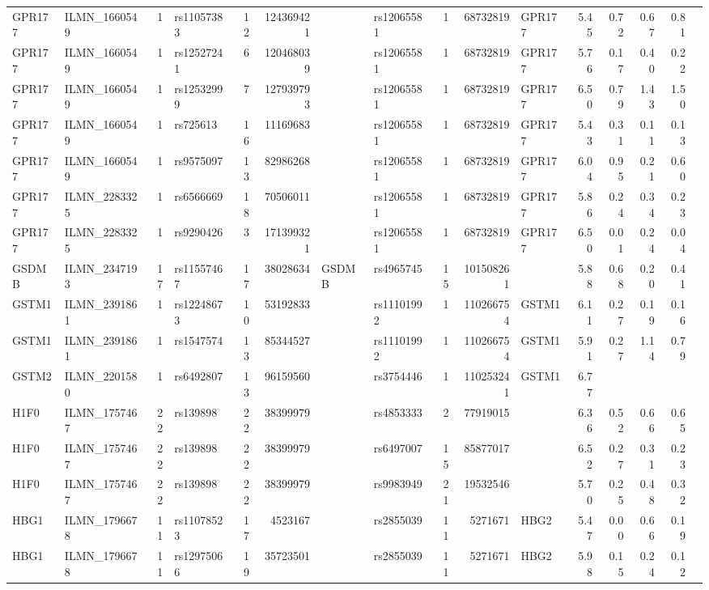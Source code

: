 \documentclass{article}
\begin{document}
\begin{landscape}
{\begin{ThreePartTable}
\begin{longtable}{|llr|lrrl|lrrl|rrrr|r|}
GPR177 & ILMN\_1660549 & 1 & rs11057383 & 12 & 124369421 &  & rs12065581 & 1 & 68732819 & GPR177 & 5.45 & 0.72 & 0.67 & 0.81 &  \\
GPR177 & ILMN\_1660549 & 1 & rs12527241 & 6 & 120468039 &  & rs12065581 & 1 & 68732819 & GPR177 & 5.76 & 0.17 & 0.40 & 0.22 &  \\
GPR177 & ILMN\_1660549 & 1 & rs12532999 & 7 & 127939793 &  & rs12065581 & 1 & 68732819 & GPR177 & 6.50 & 0.79 & 1.43 & 1.50 &  \\
GPR177 & ILMN\_1660549 & 1 & rs725613 & 16 & 11169683 &  & rs12065581 & 1 & 68732819 & GPR177 & 5.43 & 0.31 & 0.11 & 0.13 &  \\
GPR177 & ILMN\_1660549 & 1 & rs9575097 & 13 & 82986268 &  & rs12065581 & 1 & 68732819 & GPR177 & 6.04 & 0.95 & 0.21 & 0.60 &  \\
GPR177 & ILMN\_2283325 & 1 & rs6566669 & 18 & 70506011 &  & rs12065581 & 1 & 68732819 & GPR177 & 5.86 & 0.24 & 0.34 & 0.23 &  \\
GPR177 & ILMN\_2283325 & 1 & rs9290426 & 3 & 171399321 &  & rs12065581 & 1 & 68732819 & GPR177 & 6.50 & 0.01 & 0.24 & 0.04 &  \\
GSDMB & ILMN\_2347193 & 17 & rs11557467 & 17 & 38028634 & GSDMB & rs4965745 & 15 & 101508261 &  & 5.88 & 0.68 & 0.20 & 0.41 &  \\
GSTM1 & ILMN\_2391861 & 1 & rs12248673 & 10 & 53192833 &  & rs11101992 & 1 & 110266754 & GSTM1 & 6.11 & 0.27 & 0.19 & 0.16 &  \\
GSTM1 & ILMN\_2391861 & 1 & rs1547574 & 13 & 85344527 &  & rs11101992 & 1 & 110266754 & GSTM1 & 5.91 & 0.27 & 1.14 & 0.79 &  \\
GSTM2 & ILMN\_2201580 & 1 & rs6492807 & 13 & 96159560 &  & rs3754446 & 1 & 110253241 & GSTM1 & 6.77 &  &  &  &  \\
H1F0 & ILMN\_1757467 & 22 & rs139898 & 22 & 38399979 &  & rs4853333 & 2 & 77919015 &  & 6.36 & 0.52 & 0.66 & 0.65 &  \\
H1F0 & ILMN\_1757467 & 22 & rs139898 & 22 & 38399979 &  & rs6497007 & 15 & 85877017 &  & 6.52 & 0.27 & 0.31 & 0.23 &  \\
H1F0 & ILMN\_1757467 & 22 & rs139898 & 22 & 38399979 &  & rs9983949 & 21 & 19532546 &  & 5.70 & 0.25 & 0.48 & 0.32 &  \\
HBG1 & ILMN\_1796678 & 11 & rs11078523 & 17 & 4523167 &  & rs2855039 & 11 & 5271671 & HBG2 & 5.47 & 0.00 & 0.66 & 0.19 &  \\
HBG1 & ILMN\_1796678 & 11 & rs12975066 & 19 & 35723501 &  & rs2855039 & 11 & 5271671 & HBG2 & 5.98 & 0.15 & 0.24 & 0.12 &  \\

\end{longtable}
\end{ThreePartTable}}
\end{landscape}
\end{document}
